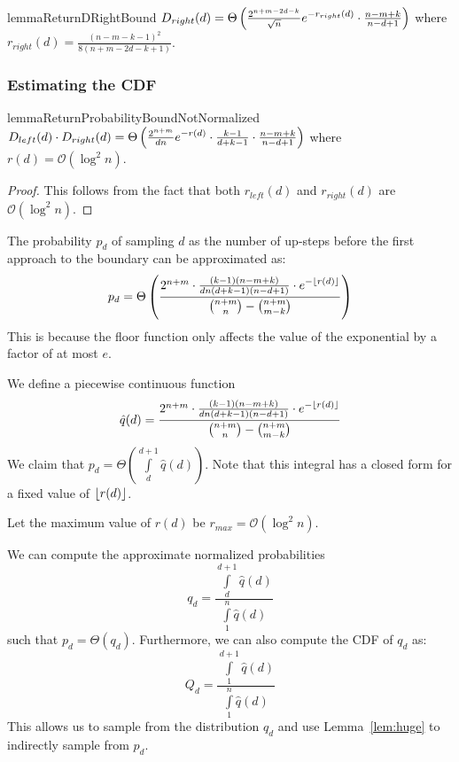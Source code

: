 \begin{restatable}{lemma}{ReturnDRightBound}
\label{lem:ReturnDRightBound}
$D_{right}(d) = \Theta\left( \frac{2^{n+m-2d-k}}{\sqrt{n}}\mathlarger e^{-r_{right}(d)}\cdot \frac{n-m+k}{n-d+1}\right)$
where $r_{right}(d) = \frac{(n-m-k-1)^2}{8(n+m-2d-k+1)}$.
\end{restatable}


\subsubsection{Estimating the CDF}%
\label{ssub:estimating_the_cdf}

\begin{restatable}{lemma}{ReturnProbabilityBoundNotNormalized}
\label{lem:ReturnProbabilityBoundNotNormalized}
$D_{left}(d)\cdot D_{right}(d)
= \Theta\left( \frac{2^{n+m}}{dn}\mathlarger e^{-r(d)}\cdot\frac{k-1}{d+k-1}\cdot\frac{n-m+k}{n-d+1}\right)$
where $r(d)=\mathcal O(\log^2 n)$.
\end{restatable}
\begin{proof}
This follows from the fact that both $r_{left}(d)$ and $r_{right}(d)$ are $\mathcal O(\log^2 n)$.
\end{proof}

\begin{corollary}
\label{cor:ReturnProbabilityRounding}
The probability $p_d$ of sampling $d$ as the number of up-steps
before the first approach to the boundary can be approximated as:
\[
p_d = \Theta\left( \frac{ 2^{n+m}\cdot\frac{(k-1)(n-m+k)}{dn(d+k-1)(n-d+1)}\cdot
\mathlarger e^{-\floor{r(d)}} }{\binom{n+m}{n}-\binom{n+m}{m-k}} \right)
\]
This is because the floor function only affects the value of the exponential by a factor of at most $e$.
\end{corollary}
\begin{corollary}
\label{cor:ReturnProbabilityPiecewiseContinuous}
We define a piecewise continuous function
\[
\hat q(d) = \frac{ 2^{n+m}\cdot\frac{(k-1)(n-m+k)}{dn(d+k-1)(n-d+1)}\cdot
\mathlarger e^{-\floor{r(d)}} }{\binom{n+m}{n}-\binom{n+m}{m-k}}
\]
We claim that $p_d = \Theta\left( \int\limits_d^{d+1} \hat q(d)\right)$.
Note that this integral has a closed form for a fixed value of $\lfloor r(d)\rfloor$.
\end{corollary}


Let the maximum value of $r(d)$ be $r_{max} = \mathcal O(\log^2 n)$.
\begin{corollary}
\label{cor:}
We can compute the approximate normalized probabilities
\[
q_d = \frac{\int\limits_d^{d+1} \hat q(d)}{\int\limits_1^{n} \hat q(d)}
\]
such that $p_d = \Theta(q_d)$.
Furthermore, we can also compute the CDF of $q_d$ as:
\[
Q_d = \frac{\int\limits_1^{d+1} \hat q(d)}{\int\limits_1^{n} \hat q(d)}
\]
This allows us to sample from the distribution $q_d$ and use Lemma~\ref{lem:huge} to indirectly sample from $p_d$.
\end{corollary}

